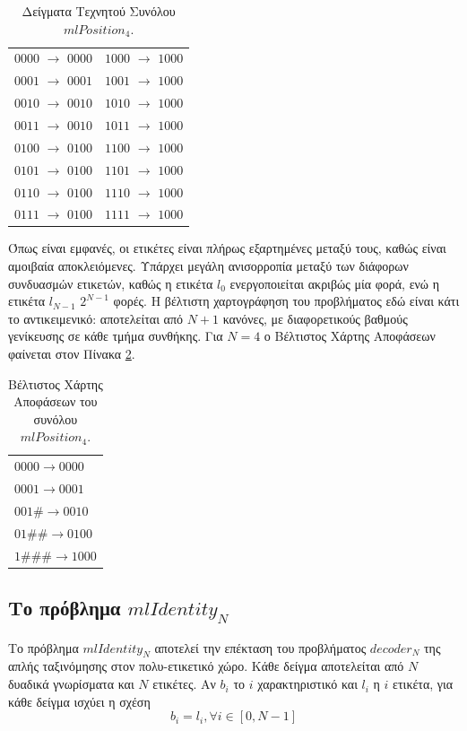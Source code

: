\begin{table}[htbp]
\caption{Δείγματα Τεχνητού Συνόλου $mlPosition_{4}$.}
\label{table:mlpos4Elements}
\begin{center}
\begin{tabular}{l|l}
$0000$ $\rightarrow$ $0000$ & $1000$ $\rightarrow$ $1000$\\
$0001$ $\rightarrow$ $0001$ & $1001$ $\rightarrow$ $1000$\\
$0010$ $\rightarrow$ $0010$ & $1010$ $\rightarrow$ $1000$\\
$0011$ $\rightarrow$ $0010$ & $1011$ $\rightarrow$ $1000$\\
$0100$ $\rightarrow$ $0100$ & $1100$ $\rightarrow$ $1000$\\
$0101$ $\rightarrow$ $0100$ & $1101$ $\rightarrow$ $1000$\\
$0110$ $\rightarrow$ $0100$ & $1110$ $\rightarrow$ $1000$\\
$0111$ $\rightarrow$ $0100$ & $1111$ $\rightarrow$ $1000$
\end{tabular}
\end{center}
\end{table}


Όπως είναι εμφανές, οι ετικέτες είναι πλήρως εξαρτημένες μεταξύ τους, καθώς είναι αμοιβαία αποκλειόμενες. Υπάρχει μεγάλη ανισορροπία μεταξύ των διάφορων συνδυασμών ετικετών, καθώς η ετικέτα $l_{0}$ ενεργοποιείται ακριβώς μία φορά, ενώ η ετικέτα $l_{N-1}$ $2^{N-1}$ φορές. Η βέλτιστη χαρτογράφηση του προβλήματος εδώ είναι κάτι το αντικειμενικό: αποτελείται από $N+1$ κανόνες, με διαφορετικούς βαθμούς γενίκευσης σε κάθε τμήμα συνθήκης. Για $N=4$ ο Βέλτιστος Χάρτης Αποφάσεων φαίνεται στον Πίνακα \ref{table:mlpos4bam}.

\begin{table}[htbp]
\caption{Βέλτιστος Χάρτης Αποφάσεων του συνόλου $mlPosition_{4}$.}
\label{table:mlpos4bam}
\begin{center}
\begin{tabular}{l}
$0000 \rightarrow 0000$\\
$0001 \rightarrow 0001$\\
$001\# \rightarrow 0010$\\
$01\#\# \rightarrow 0100$\\
$1\#\#\# \rightarrow 1000$
\end{tabular}
\end{center}
\end{table}



\subsection{Το πρόβλημα $mlIdentity_{N}$}
Το πρόβλημα $mlIdentity_{N}$ αποτελεί την επέκταση του προβλήματος $decoder_{N}$ της απλής ταξινόμησης στον πολυ-ετικετικό χώρο. Κάθε δείγμα αποτελείται από $N$ δυαδικά γνωρίσματα και $N$ ετικέτες. Αν $b_{i}$ το $i$ χαρακτηριστικό και $l_{i}$ η $i$ ετικέτα, για κάθε δείγμα ισχύει η σχέση $$b_i=l_i,\forall i \in [0, N-1]$$

